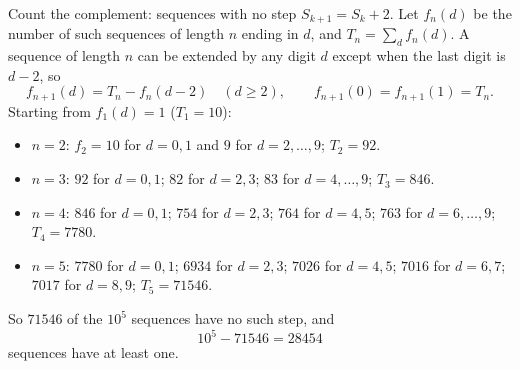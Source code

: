 Count the complement: sequences with no step $S_{k+1}=S_k+2$. Let $f_n(d)$ be the number of such sequences of length $n$ ending in $d$, and $T_n=\sum_df_n(d)$. A sequence of length $n$ can be extended by any digit $d$ except when the last digit is $d-2$, so
\[f_{n+1}(d)=T_n-f_n(d-2)\quad(d\ge2),\qquad f_{n+1}(0)=f_{n+1}(1)=T_n .\]
Starting from $f_1(d)=1$ ($T_1=10$):
\begin{itemize}
\item $n=2$: $f_2=10$ for $d=0,1$ and $9$ for $d=2,\ldots,9$; $T_2=92$.
\item $n=3$: $92$ for $d=0,1$; $82$ for $d=2,3$; $83$ for $d=4,\ldots,9$; $T_3=846$.
\item $n=4$: $846$ for $d=0,1$; $754$ for $d=2,3$; $764$ for $d=4,5$; $763$ for $d=6,\ldots,9$; $T_4=7780$.
\item $n=5$: $7780$ for $d=0,1$; $6934$ for $d=2,3$; $7026$ for $d=4,5$; $7016$ for $d=6,7$; $7017$ for $d=8,9$; $T_5=71546$.
\end{itemize}
So $71546$ of the $10^5$ sequences have no such step, and
\[10^5-71546=\boxed{28454}\]
sequences have at least one.
